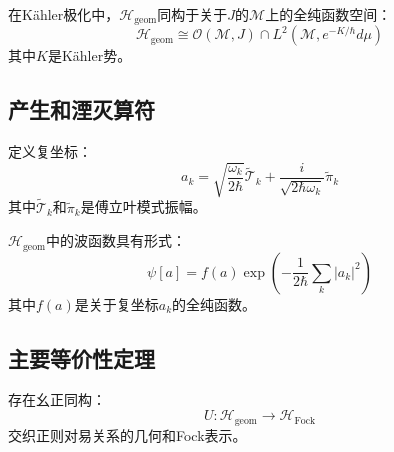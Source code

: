 \begin{theorem}[全纯表示]
在Kähler极化中，$\mathcal{H}_{\text{geom}}$同构于关于$J$的$\mathcal{M}$上的全纯函数空间：
\begin{equation}
    \mathcal{H}_{\text{geom}} \cong \mathcal{O}(\mathcal{M}, J) \cap L^2(\mathcal{M}, e^{-K/\hbar} d\mu)
\end{equation}
其中$K$是Kähler势。
\end{theorem}

\subsection{产生和湮灭算符}

\begin{definition}[复坐标]
定义复坐标：
\begin{equation}
    a_k = \sqrt{\frac{\omega_k}{2\hbar}} \tilde{\mathcal{T}}_k + \frac{i}{\sqrt{2\hbar\omega_k}} \tilde{\pi}_k
\end{equation}
其中$\tilde{\mathcal{T}}_k$和$\tilde{\pi}_k$是傅立叶模式振幅。
\end{definition}

\begin{theorem}[全纯波函数]
$\mathcal{H}_{\text{geom}}$中的波函数具有形式：
\begin{equation}
    \psi[a] = f(a) \exp\left(-\frac{1}{2\hbar} \sum_k |a_k|^2\right)
\end{equation}
其中$f(a)$是关于复坐标$a_k$的全纯函数。
\end{theorem}

\subsection{主要等价性定理}

\begin{theorem}[几何量子化等于Fock空间]
存在幺正同构：
\begin{equation}
    U : \mathcal{H}_{\text{geom}} \to \mathcal{H}_{\text{Fock}}
\end{equation}
交织正则对易关系的几何和Fock表示。
\end{theorem}

